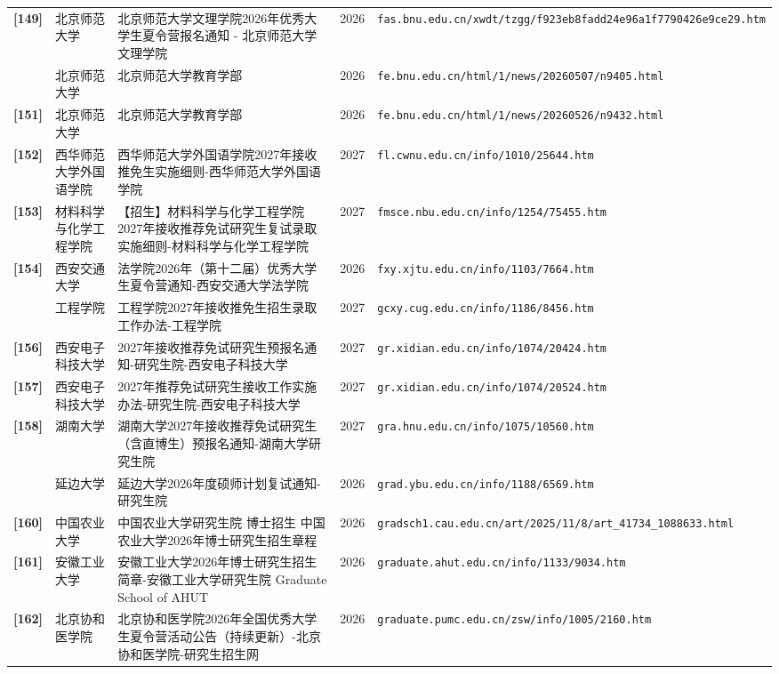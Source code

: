{\begin{longtable}{@{}p{1.15cm}p{2.9cm}p{6.3cm}p{0.85cm}p{5.0cm}@{}}
\textbf{[149]} & 北京师范大学 & 北京师范大学文理学院2026年优秀大学生夏令营报名通知 - 北京师范大学文理学院 & 2026 & \texttt{fas.bnu.edu.cn/xwdt/tzgg/f923eb8fadd24e96a1f7790426e9ce29.htm} \\
[150] & 北京师范大学 & 北京师范大学教育学部 & 2026 & \texttt{fe.bnu.edu.cn/html/1/news/20260507/n9405.html} \\
\textbf{[151]} & 北京师范大学 & 北京师范大学教育学部 & 2026 & \texttt{fe.bnu.edu.cn/html/1/news/20260526/n9432.html} \\
\textbf{[152]} & 西华师范大学外国语学院 & 西华师范大学外国语学院2027年接收推免生实施细则-西华师范大学外国语学院 & 2027 & \texttt{fl.cwnu.edu.cn/info/1010/25644.htm} \\
\textbf{[153]} & 材料科学与化学工程学院 & 【招生】材料科学与化学工程学院2027年接收推荐免试研究生复试录取实施细则-材料科学与化学工程学院 & 2027 & \texttt{fmsce.nbu.edu.cn/info/1254/75455.htm} \\
\textbf{[154]} & 西安交通大学 & 法学院2026年（第十二届）优秀大学生夏令营通知-西安交通大学法学院 & 2026 & \texttt{fxy.xjtu.edu.cn/info/1103/7664.htm} \\
[155] & 工程学院 & 工程学院2027年接收推免生招生录取工作办法-工程学院 & 2027 & \texttt{gcxy.cug.edu.cn/info/1186/8456.htm} \\
\textbf{[156]} & 西安电子科技大学 & 2027年接收推荐免试研究生预报名通知-研究生院-西安电子科技大学 & 2027 & \texttt{gr.xidian.edu.cn/info/1074/20424.htm} \\
\textbf{[157]} & 西安电子科技大学 & 2027年推荐免试研究生接收工作实施办法-研究生院-西安电子科技大学 & 2027 & \texttt{gr.xidian.edu.cn/info/1074/20524.htm} \\
\textbf{[158]} & 湖南大学 & 湖南大学2027年接收推荐免试研究生（含直博生）预报名通知-湖南大学研究生院 & 2027 & \texttt{gra.hnu.edu.cn/info/1075/10560.htm} \\
[159] & 延边大学 & 延边大学2026年度硕师计划复试通知-研究生院 & 2026 & \texttt{grad.ybu.edu.cn/info/1188/6569.htm} \\
\textbf{[160]} & 中国农业大学 & 中国农业大学研究生院 博士招生 中国农业大学2026年博士研究生招生章程 & 2026 & \texttt{gradsch1.cau.edu.cn/art/2025/11/8/art\_41734\_1088633.html} \\
\textbf{[161]} & 安徽工业大学 & 安徽工业大学2026年博士研究生招生简章-安徽工业大学研究生院 Graduate School of AHUT & 2026 & \texttt{graduate.ahut.edu.cn/info/1133/9034.htm} \\
\textbf{[162]} & 北京协和医学院 & 北京协和医学院2026年全国优秀大学生夏令营活动公告（持续更新）-北京协和医学院-研究生招生网 & 2026 & \texttt{graduate.pumc.edu.cn/zsw/info/1005/2160.htm} \\

\end{longtable}}
